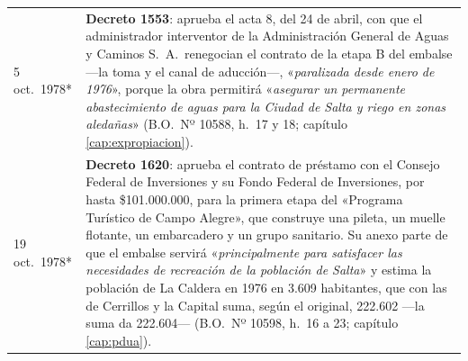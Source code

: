 \begin{longtable}{@{}p{2.7cm}p{10.3cm}@{}}
5 oct.\ 1978* & \textbf{Decreto 1553}: aprueba el acta 8, del 24 de abril, con que el administrador interventor de la Administración General de Aguas y Caminos S.\ A.\ renegocian el contrato de la etapa B del embalse ---la toma y el canal de aducción---, «\textit{paralizada desde enero de 1976}», porque la obra permitirá «\textit{asegurar un permanente abastecimiento de aguas para la Ciudad de Salta y riego en zonas aledañas}» (B.O.\ Nº 10588, h.\ 17 y 18; capítulo \ref{cap:expropiacion}). \\
19 oct.\ 1978* & \textbf{Decreto 1620}: aprueba el contrato de préstamo con el Consejo Federal de Inversiones y su Fondo Federal de Inversiones, por hasta \$101.000.000, para la primera etapa del «Programa Turístico de Campo Alegre», que construye una pileta, un muelle flotante, un embarcadero y un grupo sanitario. Su anexo parte de que el embalse servirá «\textit{principalmente para satisfacer las necesidades de recreación de la población de Salta}» y estima la población de La Caldera en 1976 en 3.609 habitantes, que con las de Cerrillos y la Capital suma, según el original, 222.602 ---la suma da 222.604--- (B.O.\ Nº 10598, h.\ 16 a 23; capítulo \ref{cap:pdua}). \\

\end{longtable}
